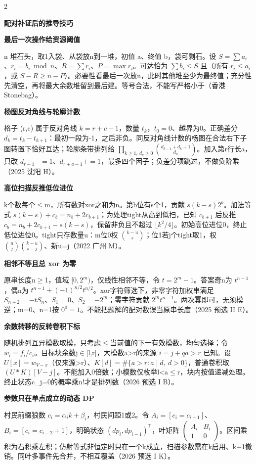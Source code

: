\documentclass[UTF8,fontset=fandol,a4paper,twoside]{ctexart}
\newcommand{\topic}[1]{\par\smallskip\textbf{#1}\par\nobreak}
\newcommand{\note}[1]{{\fontsize{10}{12}\selectfont #1\par}}
\begin{document}
\begin{multicols}{2}
\topic{配对补证后的推导技巧}
\par\textbf{最后一次操作给资源阈值}\quad
\note{n 堆石头，取1入袋、从袋放n到一堆，初值 a、终值 b，袋可剩石。设 $S=\sum a_i$、$r_i=b_i\bmod n$、$R=\sum r_i$、$P=\max r_i$。可达恰为 $\sum b_i\le S$ 且（所有 $r_i\le a_i$，或 $S-R\ge n-P$）。必要性看最后一次放n，此时其他堆至少为最终值；充分性先清空，再将最大余数堆留到最后建。等号合法，不能写严格小于（香港 Stonebag）。}
\par\textbf{杨图反对角线与轮廓计数}\quad
\note{格子 (\allowbreak{}r,\allowbreak{}c)\allowbreak{} 属于反对角线 $k=r+c-1$，数量 $t_k$，$t_0=0$、越界为0。正确差分 $d_k=t_k-t_{k+1}$：最初一段为-\allowbreak{}1，之后非负。同反对角线计数的杨图在合法右下子图转置下恰好互达；轮廓条带排列给 $\prod_{k\ge1,\ d_k\ge0}\binom{d_{k-1}+d_k+1}{d_k}$。加入第r行长a，只改 $d_{r-1}-=1$、$d_{r+a-1}+=1$，最多四个因子；负差分项跳过，不做负阶乘（2025 沈阳 H）。}
\par\textbf{高位扫描反推低位进位}\quad
\note{k个数每个\ensuremath{\le}m，所有数对xor之和为n。第b位有s个1，贡献 $s(k-s)2^b$。加法等式 $s(k-s)+c_b=n_b+2c_{b+1}$；为处理tight从高到低扫，已知 $c_{b+1}$ 后反推 $c_b=n_b+2c_{b+1}-s(k-s)$，保留非负且不超过 $\lfloor k^2/4\rfloor$。初始高位进位0，终止低位进位0。tight只存数量u：m位0权 $\binom{k-u}{s}$；位1若j个tight取1，权 $\binom uj\binom{k-u}{s-j}$、新u=\allowbreak{}j（2022 广州 M）。}
\par\textbf{相邻不等且总 xor 为零}\quad
\note{原串长度n\ensuremath{\ge}1，值域 $[0,2^m)$，仅线性相邻不等，令 $t=2^m-1$。答案奇n为 $t^{n-1}$，偶n为 $t^{n-1}+(-1)^{n/2}t^{n/2}$。xor字符筛选下，非零字符加权串满足 $S_{n+2}=-tS_n$、$S_1=0$、$S_2=-2^m$；零字符贡献 $2^m t^{n-1}$。两次幂即可，无须模逆；m=\allowbreak{}0、n=\allowbreak{}1按 $0^0=1$。不能把题解的配对数误当原串长度（2025 预选 II E）。}
\par\textbf{余数转移的反转卷积下标}\quad
\note{随机排列互异模数取模，只考虑\ensuremath{\le}当前值的下一有效模数，均匀选择；令 $w_i=f_i/c_i$。目标块余数j\ensuremath{\in}[\allowbreak{}l,\allowbreak{}r]\allowbreak{}，大模数a>\allowbreak{}r的来源 $i=j+qa>r$ 已知。设 $U[x]=w_{V-x}$（仅来源>\allowbreak{}r）、$K[d]=\#\{a>r:a\mid d,\ d>0\}$，普通卷积取 $(U*K)[V-j]$。不能加入0倍数；小模数仅枚举l<\allowbreak{}a\ensuremath{\le}r，块内按值递减处理。终止状态c\_j=\allowbreak{}0的概率乘n!才是排列数（2026 预选 I B）。}
\par\textbf{参数只在单点成立的动态 DP}\quad
\note{村民前缀狼数 $c_i=\alpha_i k+\beta_i$，村民间距1或2。令 $A_i=[c_i=c_{i-1}]$、$B_i=[c_i=c_{i-2}+1]$，明确状态 $(dp_i,dp_{i-1})^\mathsf T$，叶矩阵 $\left(\begin{smallmatrix}A_i&B_i\\1&0\end{smallmatrix}\right)$。区间乘积为右积乘左积；仿射等式非恒定时只在一个k成立，扫描参数需在k启用、k+\allowbreak{}1撤销。同叶多事件先合并，不相互覆盖（2026 预选 I K）。}

\end{multicols}
\end{document}
